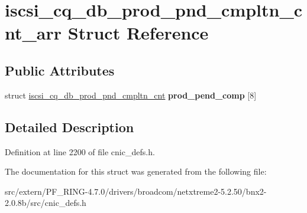 \hypertarget{structiscsi__cq__db__prod__pnd__cmpltn__cnt__arr}{
\section{iscsi\_\-cq\_\-db\_\-prod\_\-pnd\_\-cmpltn\_\-cnt\_\-arr Struct Reference}
\label{structiscsi__cq__db__prod__pnd__cmpltn__cnt__arr}
}
\subsection*{Public Attributes}
\begin{DoxyCompactItemize}
\item 
\hypertarget{structiscsi__cq__db__prod__pnd__cmpltn__cnt__arr_a24554a7775cb5dc6dbeee76589c26ad9}{
struct \hyperlink{structiscsi__cq__db__prod__pnd__cmpltn__cnt}{iscsi\_\-cq\_\-db\_\-prod\_\-pnd\_\-cmpltn\_\-cnt} {\bfseries prod\_\-pend\_\-comp} \mbox{[}8\mbox{]}}
\label{structiscsi__cq__db__prod__pnd__cmpltn__cnt__arr_a24554a7775cb5dc6dbeee76589c26ad9}

\end{DoxyCompactItemize}


\subsection{Detailed Description}


Definition at line 2200 of file cnic\_\-defs.h.



The documentation for this struct was generated from the following file:\begin{DoxyCompactItemize}
\item 
src/extern/PF\_\-RING-\/4.7.0/drivers/broadcom/netxtreme2-\/5.2.50/bnx2-\/2.0.8b/src/cnic\_\-defs.h\end{DoxyCompactItemize}
